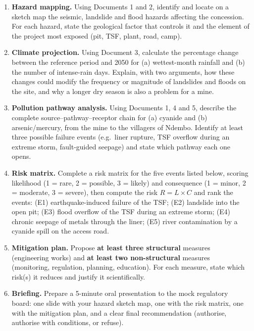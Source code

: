 \documentclass[11pt]{article}
\newcommand{\cle}[1]{{\popxbold\color{popdark}#1}}
\newcounter{popsec}
\newcounter{popsub}
\newcommand{\courssub}[1]{%
  \stepcounter{popsub}%
  \par\vspace{9pt}\noindent{\popxbold\fontsize{11.5}{13}\selectfont\color{popink}{\color{poporange}\thepopsec.\thepopsub}\hspace{6pt}#1}\par\nopagebreak\vspace{4pt}
}
\begin{document}
\courssub{Tasks}

\begin{enumerate}
\item \textbf{Hazard mapping.} Using Documents 1 and 2, identify and locate on a sketch map the seismic, landslide and flood hazards affecting the concession. For each hazard, state the geological factor that controls it and the element of the project most exposed (pit, TSF, plant, road, camp).
\item \textbf{Climate projection.} Using Document 3, calculate the percentage change between the reference period and 2050 for (a) wettest-month rainfall and (b) the number of intense-rain days. Explain, with two arguments, how these changes could modify the frequency or magnitude of landslides and floods on the site, and why a longer dry season is also a problem for a mine.
\item \textbf{Pollution pathway analysis.} Using Documents 1, 4 and 5, describe the complete \cle{source--pathway--receptor} chain for (a) cyanide and (b) arsenic/mercury, from the mine to the villagers of Ndembo. Identify at least three possible failure events (e.g.\ liner rupture, TSF overflow during an extreme storm, fault-guided seepage) and state which pathway each one opens.
\item \textbf{Risk matrix.} Complete a risk matrix for the five events listed below, scoring likelihood (1 = rare, 2 = possible, 3 = likely) and consequence (1 = minor, 2 = moderate, 3 = severe), then compute the risk $R = L \times C$ and rank the events: (E1) earthquake-induced failure of the TSF; (E2) landslide into the open pit; (E3) flood overflow of the TSF during an extreme storm; (E4) chronic seepage of metals through the liner; (E5) river contamination by a cyanide spill on the access road.
\item \textbf{Mitigation plan.} Propose \textbf{at least three structural} measures (engineering works) and \textbf{at least two non-structural} measures (monitoring, regulation, planning, education). For each measure, state which risk(s) it reduces and justify it scientifically.
\item \textbf{Briefing.} Prepare a 5-minute oral presentation to the mock regulatory board: one slide with your hazard sketch map, one with the risk matrix, one with the mitigation plan, and a clear final recommendation (authorise, authorise with conditions, or refuse).
\end{enumerate}
\end{document}
